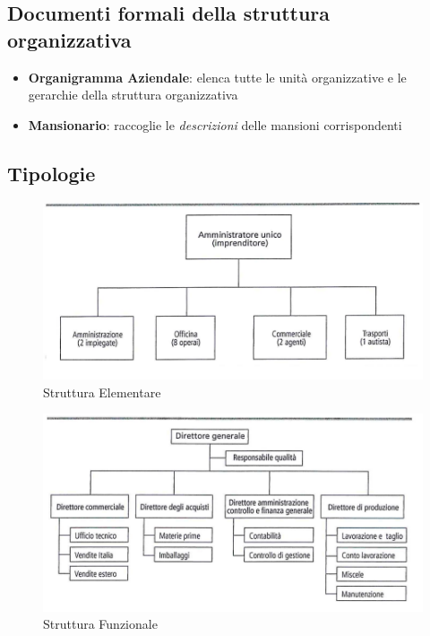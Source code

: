 \documentclass[12pt]{article}
\begin{document}
\subsection{Documenti formali della struttura organizzativa}
\begin{itemize}
    \item \textbf{Organigramma Aziendale}: elenca tutte le unità organizzative e le gerarchie della struttura organizzativa
    \item \textbf{Mansionario}: raccoglie le \textit{descrizioni} delle mansioni corrispondenti
\end{itemize}
\newpage
\subsection{Tipologie}
\begin{figure}[!htb]
    \centering
    \includegraphics[width=1\textwidth]{images/elementare.png}
    \caption{Struttura Elementare}
\end{figure}
\FloatBarrier
\begin{figure}[!htb]
    \centering
    \includegraphics[width=1\textwidth]{images/funzionale.png}
    \caption{Struttura Funzionale}
\end{figure}
\FloatBarrier
\end{document}
